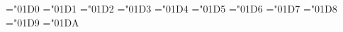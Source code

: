 










\mathchardef\Gamma="01D0
\mathchardef\Delta="01D1
\mathchardef\Theta="01D2
\mathchardef\Lambda="01D3
\mathchardef\Xi="01D4
\mathchardef\Pi="01D5
\mathchardef\Sigma="01D6
\mathchardef\Upsilon="01D7
\mathchardef\Phi="01D8
\mathchardef\Psi="01D9
\mathchardef\Omega="01DA


